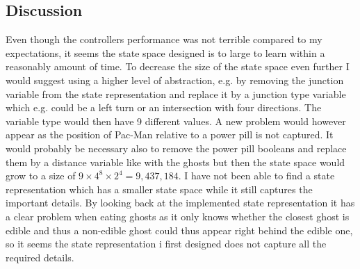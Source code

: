 \documentclass[conference]{IEEEtran}
\begin{document}
\subsection{Discussion}
Even though the controllers performance was not terrible compared to my expectations, it seems the state space designed is to large to learn within a reasonably amount of time. To decrease the size of the state space even further I would suggest using a higher level of abstraction, e.g. by removing the junction variable from the state representation and replace it by a junction type variable which e.g. could be a left turn or an intersection with four directions. The variable type would then have 9 different values. A new problem would however appear as the position of Pac-Man relative to a power pill is not captured. It would probably be necessary also to remove the power pill booleans and replace them by a distance variable like with the ghosts but then the state space would grow to a size of $9\times4^{8}\times2^{4}=9,437,184$. I have not been able to find a state representation which has a smaller state space while it still captures the important details. By looking back at the implemented state representation it has a clear problem when eating ghosts as it only knows whether the closest ghost is edible and thus a non-edible ghost could thus appear right behind the edible one, so it seems the state representation i first designed does not capture all the required details.
\end{document}
